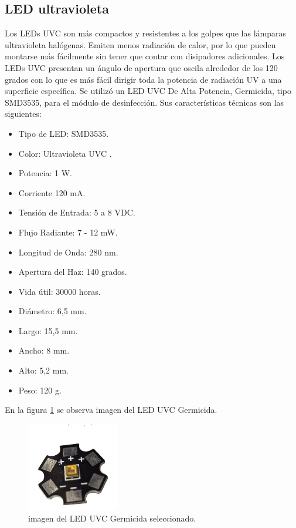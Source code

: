 \subsection{LED ultravioleta }
Los LEDs UVC son más compactos y resistentes a los golpes que las lámparas ultravioleta halógenas. Emiten menos radiación de calor, por lo que pueden montarse más fácilmente sin tener que contar con disipadores adicionales. 
Los LEDs UVC presentan un ángulo de apertura que oscila alrededor de los 120 grados con lo que es más fácil dirigir toda la potencia de radiación UV a una superficie específica.
Se utilizó un LED UVC De Alta Potencia, Germicida, tipo SMD3535, para el módulo de desinfección. Sus características técnicas son las siguientes:

\begin{itemize}
	\item Tipo de LED:		SMD3535.
	\item Color:		Ultravioleta UVC .
	\item Potencia:		1 W.
	\item Corriente		120 mA.	
	\item Tensión de Entrada:	5 a 8 VDC.
	\item Flujo Radiante:	7 - 12 mW.
	\item Longitud de Onda:	280 nm.
	\item Apertura del Haz:	140 grados.	
	\item Vida útil:	30000 horas.	
	\item Diámetro:		6,5 mm.	
	\item Largo:		15,5 mm.	
	\item Ancho:		8 mm.		
	\item Alto:			5,2 mm.		
	\item Peso: 		120 g.		
\end{itemize}


En la figura \ref{fig:leduvc} se observa imagen del LED UVC Germicida.

\begin{figure}[h]
	\centering
	\includegraphics[width=4cm]{./Figures/leduvc.PNG}
	\caption{imagen del LED UVC Germicida seleccionado\protect\footnotemark.}
	\label{fig:leduvc}
\end{figure}





